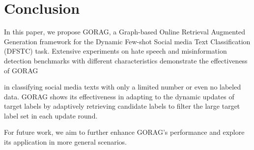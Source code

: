  \vspace{-5px}
\section{Conclusion}\label{sec:conclusion}

In this paper, we propose GORAG, a Graph-based Online Retrieval Augmented Generation framework for the Dynamic Few-shot Social media Text Classification (DFSTC) task. 
Extensive experiments on hate speech and misinformation detection benchmarks with different characteristics demonstrate the effectiveness of GORAG 

in classifying social media texts with only a limited number or even no labeled data. 
GORAG shows its effectiveness in adapting to the dynamic updates of target labels by adaptively retrieving candidate labels to filter the large target label set in each update round. 

For future work, we aim to further enhance GORAG's performance and explore its application in more general scenarios.